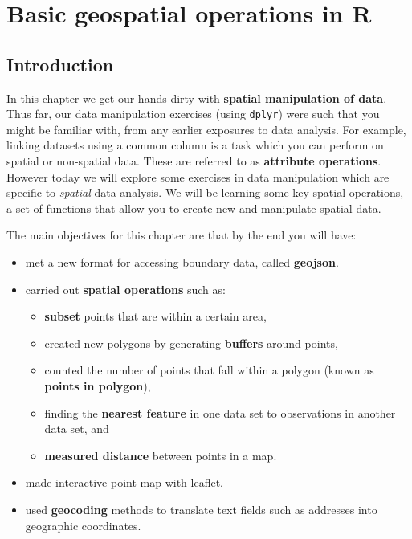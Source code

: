 \documentclass[
  krantz2]{krantz}
\providecommand{\tightlist}{%
  \setlength{\itemsep}{0pt}\setlength{\parskip}{0pt}}
\begin{document}
\hypertarget{basic-geospatial-operations-in-r}{%
\chapter{Basic geospatial operations in R}\label{basic-geospatial-operations-in-r}}

\hypertarget{introduction-1}{%
\section{Introduction}\label{introduction-1}}

In this chapter we get our hands dirty with \textbf{spatial manipulation of data}. Thus far, our data manipulation exercises (using \texttt{dplyr}) were such that you might be familiar with, from any earlier exposures to data analysis. For example, linking datasets using a common column is a task which you can perform on spatial or non-spatial data. These are referred to as \textbf{attribute operations}. However today we will explore some exercises in data manipulation which are specific to \emph{spatial} data analysis. We will be learning some key spatial operations, a set of functions that allow you to create new and manipulate spatial data.

The main objectives for this chapter are that by the end you will have:

\begin{itemize}
\tightlist
\item
  met a new format for accessing boundary data, called \textbf{geojson}.
\item
  carried out \textbf{spatial operations} such as:

  \begin{itemize}
  \tightlist
  \item
    \textbf{subset} points that are within a certain area,
  \item
    created new polygons by generating \textbf{buffers} around points,
  \item
    counted the number of points that fall within a polygon (known as \textbf{points in polygon}),
  \item
    finding the \textbf{nearest feature} in one data set to observations in another data set, and
  \item
    \textbf{measured distance} between points in a map.
  \end{itemize}
\item
  made interactive point map with leaflet.
\item
  used \textbf{geocoding} methods to translate text fields such as addresses into geographic coordinates.
\end{itemize}
\end{document}
